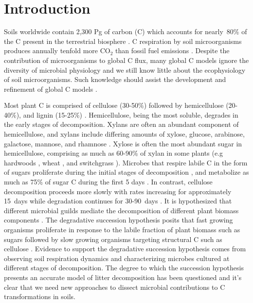 \section{Introduction}
Soils worldwide contain 2,300 Pg of carbon (C) which accounts for nearly~80\%
of the C present in the terrestrial biosphere
\citep{Amundson_2001,BATJES_1996}. C respiration by soil microorganisms
produces annually tenfold more CO$_{2}$ than fossil fuel emissions
\citep{chapin2002principles}. Despite the contribution of microorganisms to
global C flux, many global C models ignore the diversity of microbial
physiology \citep{Allison2010,Six2006,Treseder2011} and we still know little
about the ecophysiology of soil microorganisms. Such knowledge should
assist the development and refinement of global C models
\citep{Bradford2008,Neff_2001,McGuire2010,Wieder2013}.

Most plant C is comprised of cellulose (30-50\%) followed by hemicellulose
(20-40\%), and lignin (15-25\%) \citep{Lynd2002}. Hemicellulose, being the most
soluble, degrades in the early stages of decomposition. Xylans are often an
abundant component of hemicellulose, and xylans include differing
amounts of xylose, glucose, arabinose, galactose, mannose, and rhamnose
\citep{Saha2003}. Xylose is often the most abundant sugar in hemicellulose,
comprising as much as 60-90\% of xylan in some plants (e.g hardwoods
\citep{Spiridon2008}, wheat \citep{Sun2005}, and switchgrass
\citep{Bunnell2013}). Microbes that respire labile C in the form of sugars
proliferate during the initial stages of decomposition
\citep{Garrett1951,Alexander1964}, and metabolize as much as 75\% of sugar
C during the first 5 days \citep{Engelking2007}. In contrast,
cellulose decomposition proceeds more slowly with rates increasing for
approximately 15~days while degradation continues for 30-90~days
\citep{Hu1997,Engelking2007}. It is hypothesized that different microbial
guilds mediate the decomposition of different plant biomass components
\citep{Hu1997,Rui2009,AnneliseHKjoller2002,Bastian_2009}. The degradative
succession hypothesis posits that fast growing organisms proliferate in
response to the labile fraction of plant biomass such as sugars
\citep{Garrett1963,Bremer1994} followed by slow growing organisms targeting
structural C such as cellulose \citep{Garrett1963}. Evidence to support the
degradative succession hypothesis comes from observing soil respiration
dynamics and characterizing microbes cultured at different stages of
decomposition. The degree to which the succession hypothesis presents an
accurate model of litter decomposition has been questioned
\citep{AnneliseHKjoller2002,Frankland_1998,Osono_2005} and it's clear that we
need new approaches to dissect microbial contributions to C transformations in
soils.


